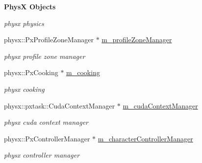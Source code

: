 \begin{Indent}{\bf PhysX Objects}
\begin{DoxyCompactItemize}
\begin{DoxyCompactList}\small\item\em physx physics \item\end{DoxyCompactList}\item 
\hypertarget{classContent_1_1Physics_1_1PhysicsPhysX_af89cca39b2c0efe46891e6dff6903cf4}{
physx::PxProfileZoneManager $\ast$ \hyperlink{classContent_1_1Physics_1_1PhysicsPhysX_af89cca39b2c0efe46891e6dff6903cf4}{m\_\-profileZoneManager}}
\label{classContent_1_1Physics_1_1PhysicsPhysX_af89cca39b2c0efe46891e6dff6903cf4}

\begin{DoxyCompactList}\small\item\em physx profile zone manager \item\end{DoxyCompactList}\item 
\hypertarget{classContent_1_1Physics_1_1PhysicsPhysX_ad0334e60aa4268d9d96d3e142760a8d7}{
physx::PxCooking $\ast$ \hyperlink{classContent_1_1Physics_1_1PhysicsPhysX_ad0334e60aa4268d9d96d3e142760a8d7}{m\_\-cooking}}
\label{classContent_1_1Physics_1_1PhysicsPhysX_ad0334e60aa4268d9d96d3e142760a8d7}

\begin{DoxyCompactList}\small\item\em physx cooking \item\end{DoxyCompactList}\item 
\hypertarget{classContent_1_1Physics_1_1PhysicsPhysX_acd76517d0335139f1fbceaaf3512d83b}{
physx::pxtask::CudaContextManager $\ast$ \hyperlink{classContent_1_1Physics_1_1PhysicsPhysX_acd76517d0335139f1fbceaaf3512d83b}{m\_\-cudaContextManager}}
\label{classContent_1_1Physics_1_1PhysicsPhysX_acd76517d0335139f1fbceaaf3512d83b}

\begin{DoxyCompactList}\small\item\em physx cuda context manager \item\end{DoxyCompactList}\item 
\hypertarget{classContent_1_1Physics_1_1PhysicsPhysX_ac0d2bd43d7c28e84e7f6682b9dfdc974}{
physx::PxControllerManager $\ast$ \hyperlink{classContent_1_1Physics_1_1PhysicsPhysX_ac0d2bd43d7c28e84e7f6682b9dfdc974}{m\_\-characterControllerManager}}
\label{classContent_1_1Physics_1_1PhysicsPhysX_ac0d2bd43d7c28e84e7f6682b9dfdc974}

\begin{DoxyCompactList}\small\item\em physx controller manager \item\end{DoxyCompactList}\end{DoxyCompactItemize}
\end{Indent}


